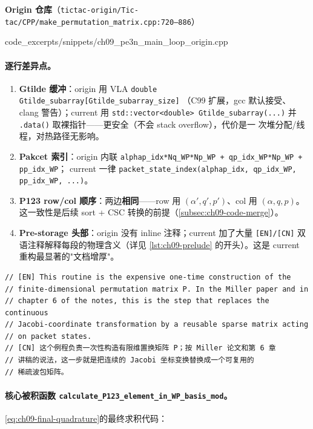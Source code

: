 \noindent\textbf{Origin 仓库}（\texttt{tictac-origin/Tic-tac/CPP/make\_permutation\_matrix.cpp:720--886}）


{code_excerpts/snippets/ch09_pe3n_main_loop_origin.cpp}

\paragraph{逐行差异点。}
\begin{enumerate}
\item \textbf{Gtilde 缓冲}：origin 用 VLA \verb|double Gtilde_subarray[Gtilde_subarray_size]|
      （C99 扩展，gcc 默认接受、clang 警告）；current 用 \verb|std::vector<double> Gtilde_subarray(...)|
      并 \verb|.data()| 取裸指针——更安全（不会 stack overflow），代价是一
      次堆分配/线程，对热路径无影响。
\item \textbf{Pakcet 索引}：origin 内联
      \verb|alphap_idx*Nq_WP*Np_WP + qp_idx_WP*Np_WP + pp_idx_WP|；
      current 一律 \verb|packet_state_index(alphap_idx, qp_idx_WP, pp_idx_WP, ...)|。
\item \textbf{P123 row/col 顺序}：两边\textbf{相同}——row 用
      \((\alpha', q', p')\)、col 用 \((\alpha, q, p)\)。这一致性是后续
      sort + CSC 转换的前提（\cref{subsec:ch09-code-merge}）。
\item \textbf{Pre-storage 头部}：origin 没有 inline 注释；current 加了大量
      \texttt{[EN]/[CN]} 双语注释解释每段的物理含义（详见
      \cref{lst:ch09-prelude} 的开头）。这是 current 重构最显著的"文档增厚"。
\end{enumerate}

\begin{lstlisting}[style=cpp, caption={current 主例程头部的双语注释（节选自 prelude）},
                   label={lst:ch09-prelude}]
// [EN] This routine is the expensive one-time construction of the
// finite-dimensional permutation matrix P. In the Miller paper and in
// chapter 6 of the notes, this is the step that replaces the continuous
// Jacobi-coordinate transformation by a reusable sparse matrix acting
// on packet states.
// [CN] 这个例程负责一次性构造有限维置换矩阵 P；按 Miller 论文和第 6 章
// 讲稿的说法，这一步就是把连续的 Jacobi 坐标变换替换成一个可复用的
// 稀疏波包矩阵。
\end{lstlisting}

\paragraph{核心被积函数 \texttt{calculate\_P123\_element\_in\_WP\_basis\_mod}。}
\eqref{eq:ch09-final-quadrature}的最终求积代码：


